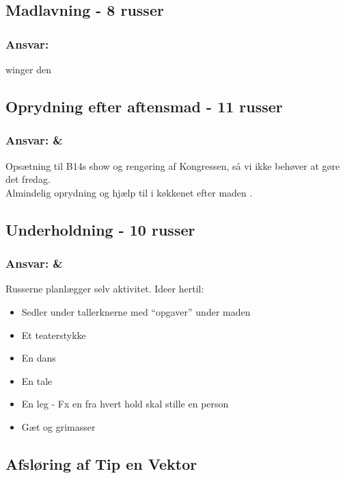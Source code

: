 \subsection*{Madlavning - 8 russer}
\subsubsection*{Ansvar: }
 winger den

\subsection*{Oprydning efter aftensmad - 11 russer}
\subsubsection*{Ansvar: \Farav \& \Mighty}
Opsætning til B14s show og rengøring af Kongressen, så vi ikke behøver at gøre det fredag.\\
Almindelig oprydning og hjælp til  i køkkenet efter maden . 

\subsection*{Underholdning - 10 russer}
\subsubsection*{Ansvar: \Karla \& \Buddha}
Russerne planlægger selv aktivitet. Ideer hertil:
\begin{itemize}
  \item Sedler under tallerknerne  med ``opgaver'' under maden
  \item Et teaterstykke
  \item En dans
  \item En tale
  \item En leg - Fx en fra hvert hold skal stille en person
  \item Gæt og grimasser 
\end{itemize}

\subsection{Afsløring af Tip en Vektor}


